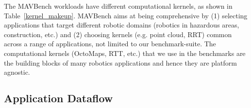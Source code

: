 The MAVBench workloads have different computational kernels, as shown in Table~\ref{kernel_makeup}. MAVBench aims at being comprehensive by (1) selecting applications that target different robotic domains (robotics in hazardous areas, construction, etc.) and (2) choosing kernels (e.g. point cloud, RRT) common across a range of applications, not limited to our benchmark-suite. The computational kernels (OctoMaps, RTT, etc.) that we use in the benchmarks are the building blocks of many robotics applications and hence they are platform agnostic. 





\subsection{Application Dataflow} \label{sec:sw_pipeline}

